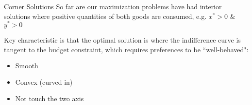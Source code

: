 \documentclass[12pt,t]{beamer}
\begin{document}
\begin{frame}{Corner Solutions}
  So far are our maximization problems have had interior solutions where positive quantities of both goods are consumed, e.g. $x^{*}>0$ \& $y^{*}>0$
  
  \bigskip
  Key characteristic is that the optimal solution is where the indifference curve is tangent to the budget constraint, which requires preferences to be ``well-behaved":
  \begin{itemize}
    \item Smooth

    \item Convex (curved in)
    
    \item Not touch the two axis
  \end{itemize} 
\end{frame}
\end{document}
